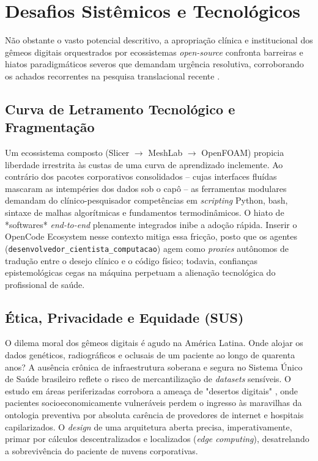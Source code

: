 \section{Desafios Sistêmicos e Tecnológicos}

Não obstante o vasto potencial descritivo, a apropriação clínica e institucional dos gêmeos digitais orquestrados por ecossistemas \textit{open-source} confronta barreiras e hiatos paradigmáticos severos que demandam urgência resolutiva, corroborando os achados recorrentes na pesquisa translacional recente \cite{duggal2026exploring, menon2026digital}.

\subsection{Curva de Letramento Tecnológico e Fragmentação}
Um ecossistema composto (Slicer $\rightarrow$ MeshLab $\rightarrow$ OpenFOAM) propicia liberdade irrestrita às custas de uma curva de aprendizado inclemente. Ao contrário dos pacotes corporativos consolidados -- cujas interfaces fluídas mascaram as intempéries dos dados sob o capô -- as ferramentas modulares demandam do clínico-pesquisador competências em \textit{scripting} Python, bash, sintaxe de malhas algorítmicas e fundamentos termodinâmicos. O hiato de *softwares* \textit{end-to-end} plenamente integrados inibe a adoção rápida. Inserir o OpenCode Ecosystem nesse contexto mitiga essa fricção, posto que os agentes (\texttt{desenvolvedor\_cientista\_computacao}) agem como \textit{proxies} autônomos de tradução entre o desejo clínico e o código físico; todavia, confianças epistemológicas cegas na máquina perpetuam a alienação tecnológica do profissional de saúde.

\subsection{Ética, Privacidade e Equidade (SUS)}
O dilema moral dos gêmeos digitais \cite{realising2026digital} é agudo na América Latina. Onde alojar os dados genéticos, radiográficos e oclusais de um paciente ao longo de quarenta anos? A ausência crônica de infraestrutura soberana e segura no Sistema Único de Saúde brasileiro reflete o risco de mercantilização de \textit{datasets} sensíveis. O estudo em áreas periferizadas corrobora a ameaça de "desertos digitais" \cite{cuadros2023assessing, du2020marginalized}, onde pacientes socioeconomicamente vulneráveis perdem o ingresso às maravilhas da ontologia preventiva por absoluta carência de provedores de internet e hospitais capilarizados. O \textit{design} de uma arquitetura aberta precisa, imperativamente, primar por cálculos descentralizados e localizados (\textit{edge computing}), desatrelando a sobrevivência do paciente de nuvens corporativas.

